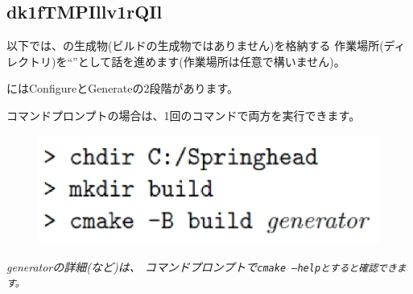 \subsection{dk1fTMPIllv1rQIl}
\label{subsec:CmakeLibrary}

\noindent
\KLUDGE 以下では、\cmake \KLUDGE の生成物(\KLUDGE ビルドの生成物ではありません)\KLUDGE を格納する
\KLUDGE 作業場所(\KLUDGE ディレクトリ)\KLUDGE を``\build''\KLUDGE として話を進めます(\KLUDGE 作業場所は任意で構いません)\KLUDGE 。

\medskip
\noindent
\cmake \KLUDGE にはConfigure\KLUDGE とGenerate\KLUDGE の2\KLUDGE 段階があります。

\medskip
\noindent
\KLUDGE コマンドプロンプトの場合は、1\KLUDGE 回のコマンドで両方を実行できます。
\ifLwarp
	\begin{figure}[h]
	    \begin{center}
	    \includegraphics[width=\textwidth]{fig/command-2-3.eps}
	    \end{center}
	    \label{fig:DownloadTree}
	\end{figure}
\else
\begin{narrow}[15pt]
	\it{generator\KLUDGE の}\KLUDGE 詳細(\KLUDGE など)\KLUDGE は、
	\KLUDGE コマンドプロンプトで\tt{cmake --help}\KLUDGE とすると確認できます。
\end{narrow}
\fi

